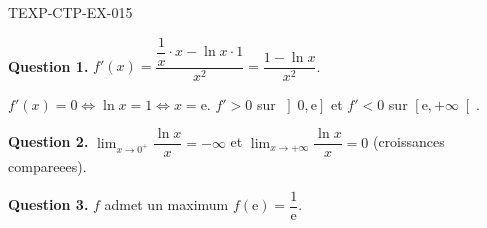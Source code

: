 \begin{corrige}{TEXP-CTP-EX-015}

\textbf{Question 1.} $f'(x) = \dfrac{\dfrac{1}{x} \cdot x - \ln x \cdot 1}{x^2} = \dfrac{1 - \ln x}{x^2}$.


$f'(x) = 0 \iff \ln x = 1 \iff x = \mathrm{e}$. $f' > 0$ sur $\left]0, \mathrm{e}\right]$ et $f' < 0$ sur $\left[\mathrm{e}, +\infty\right[$.

\textbf{Question 2.} $\lim_{x \to 0^+} \dfrac{\ln x}{x} = -\infty$ et $\lim_{x \to +\infty} \dfrac{\ln x}{x} = 0$ (croissances compareees).

\textbf{Question 3.} $f$ admet un maximum $f(\mathrm{e}) = \dfrac{1}{\mathrm{e}}$.

\end{corrige}
